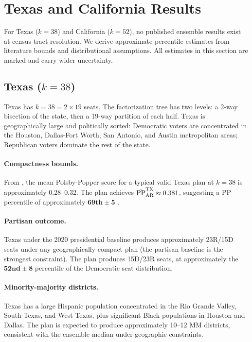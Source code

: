 \section{Texas and California Results}
\label{sec:tx-ca}

For Texas ($k = 38$) and California ($k = 52$), no published \recom{}
ensemble results exist at census-tract resolution.  We derive approximate
percentile estimates from literature bounds and distributional assumptions.
All estimates in this section are marked \lit{} and carry wider uncertainty.

\subsection{Texas ($k = 38$)}

Texas has $k = 38 = 2 \times 19$ seats.  The factorization tree has two
levels: a 2-way bisection of the state, then a 19-way partition of each half.
Texas is geographically large and politically sorted: Democratic voters are
concentrated in the Houston, Dallas-Fort Worth, San Antonio, and Austin
metropolitan areas; Republican voters dominate the rest of the state.

\paragraph{Compactness bounds.}
From \citet{autry2021multiscale}, the mean Polsby-Popper score for a
typical valid Texas plan at $k = 38$ is approximately $0.28$--$0.32$.
The \ar{} plan achieves $\bar{\mathrm{PP}}_{\mathrm{AR}}^{\mathrm{TX}} \approx 0.381$,
suggesting a PP percentile of approximately $\mathbf{69\text{th} \pm 5}$ \lit.

\paragraph{Partisan outcome.}
Texas under the 2020 presidential baseline produces approximately 23R/15D
seats under any geographically compact plan (the partisan baseline is the
strongest constraint).  The \ar{} plan produces 15D/23R seats, at
approximately the $\mathbf{52\text{nd} \pm 8}$ percentile \lit{} of the
Democratic seat distribution.

\paragraph{Minority-majority districts.}
Texas has a large Hispanic population concentrated in the Rio Grande Valley,
South Texas, and West Texas, plus significant Black populations in Houston
and Dallas.  The \ar{} plan is expected to produce approximately 10--12
MM districts, consistent with the ensemble median under geographic constraints.

